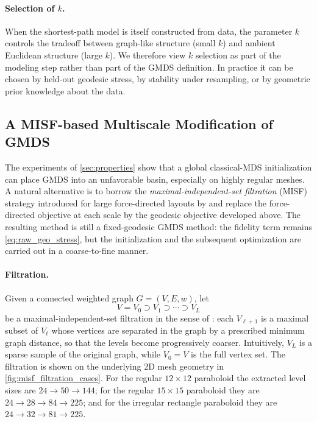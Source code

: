 \documentclass[twoside,11pt]{article}
\begin{document}
\paragraph{Selection of $k$.}
When the shortest-path model is itself constructed from data, the parameter $k$
controls the tradeoff between graph-like structure (small $k$) and ambient
Euclidean structure (large $k$).  We therefore view $k$ selection as part of
the modeling step rather than part of the GMDS definition.  In practice it can
be chosen by held-out geodesic stress, by stability under resampling, or by
geometric prior knowledge about the data.

\subsection{A MISF-based Multiscale Modification of GMDS}
\label{sec:misf_gmds}

The experiments of \cref{sec:properties} show that a global classical-MDS
initialization can place GMDS into an unfavorable basin, especially on highly
regular meshes.  A natural alternative is to borrow the
\emph{maximal-independent-set filtration} (MISF) strategy introduced for large
force-directed layouts by \citet{gajer2004multidimensional,gajer2002grip} and
replace the force-directed objective at each scale by the geodesic objective
developed above.  The resulting method is still a fixed-geodesic GMDS method:
the fidelity term remains \cref{eq:raw_geo_stress}, but the initialization and
the subsequent optimization are carried out in a coarse-to-fine manner.

\paragraph{Filtration.}
Given a connected weighted graph $G=(V,E,w)$, let
\[
  V = V_0 \supset V_1 \supset \cdots \supset V_L
\]
be a maximal-independent-set filtration in the sense of
\citet{gajer2004multidimensional,gajer2002grip}: each $V_{\ell+1}$ is a maximal
subset of $V_\ell$ whose vertices are separated in the graph by a prescribed
minimum graph distance, so that the levels become progressively coarser.
Intuitively, $V_L$ is a sparse sample of the original graph, while $V_0=V$ is
the full vertex set.  The filtration is shown on the underlying $2$D mesh
geometry in \cref{fig:misf_filtration_cases}.  For the regular $12\times 12$
paraboloid the extracted level sizes are $24 \rightarrow 50 \rightarrow 144$;
for the regular $15\times 15$ paraboloid they are
$24 \rightarrow 28 \rightarrow 84 \rightarrow 225$; and for the irregular
rectangle paraboloid they are $24 \rightarrow 32 \rightarrow 81 \rightarrow
225$.
\end{document}
